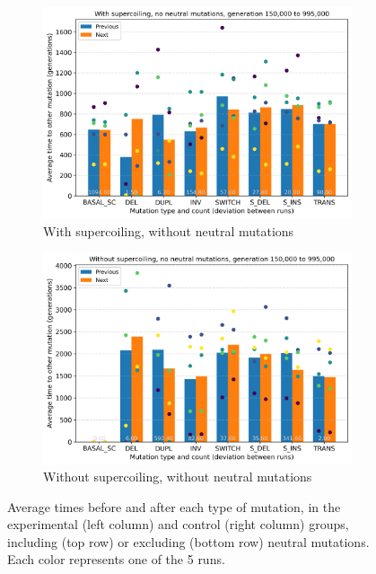 \begin{figure}[h]
  \begin{subfigure}[b]{0.49\textwidth}
    \includegraphics[width=\textwidth]{aevol/images/with_sc_mut_time_no_neutral_150k_995k.png}
    \caption{With supercoiling, without neutral mutations}
    \label{subfig:sc_no_neut}
  \end{subfigure}
  \begin{subfigure}[b]{0.49\textwidth}
    \includegraphics[width=\textwidth]{aevol/images/without_sc_mut_time_no_neutral_150k_995k.png}
    \caption{Without supercoiling, without neutral mutations}
    \label{subfig:no_sc_no_neut}
  \end{subfigure}

  \caption{Average times before and after each type of mutation, in the experimental (left column) and control (right column) groups, including (top row) or excluding (bottom row) neutral mutations. Each color represents one of the 5 runs.}
  \label{fig:mut_times}
\end{figure}

